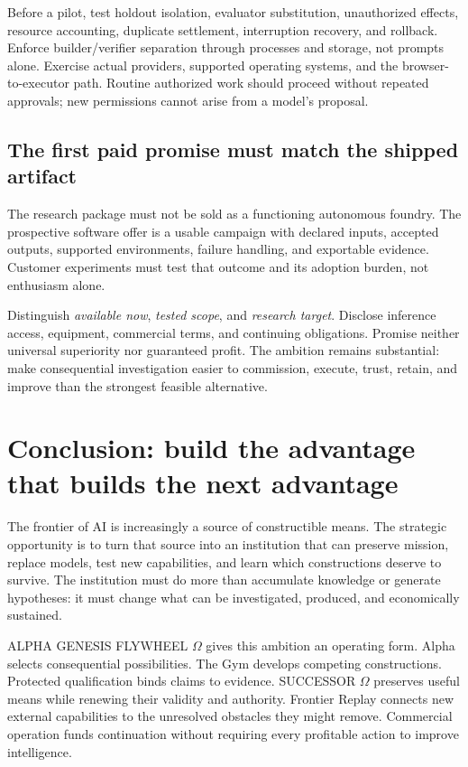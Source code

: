 \documentclass[11pt,letterpaper]{article}
\theoremstyle{remark}\newtheorem{remark}{Remark}[section]
\begin{document}
Before a pilot, test holdout isolation, evaluator substitution, unauthorized effects, resource accounting, duplicate settlement, interruption recovery, and rollback. Enforce builder/verifier separation through processes and storage, not prompts alone. Exercise actual providers, supported operating systems, and the browser-to-executor path. Routine authorized work should proceed without repeated approvals; new permissions cannot arise from a model's proposal.

\subsection{The first paid promise must match the shipped artifact}
The research package must not be sold as a functioning autonomous foundry. The prospective software offer is a usable campaign with declared inputs, accepted outputs, supported environments, failure handling, and exportable evidence. Customer experiments must test that outcome and its adoption burden, not enthusiasm alone.

Distinguish \emph{available now}, \emph{tested scope}, and \emph{research target}. Disclose inference access, equipment, commercial terms, and continuing obligations. Promise neither universal superiority nor guaranteed profit. The ambition remains substantial: make consequential investigation easier to commission, execute, trust, retain, and improve than the strongest feasible alternative.

\section{Conclusion: build the advantage that builds the next advantage}
\label{sec:conclusion}
The frontier of AI is increasingly a source of constructible means. The strategic opportunity is to turn that source into an institution that can preserve mission, replace models, test new capabilities, and learn which constructions deserve to survive. The institution must do more than accumulate knowledge or generate hypotheses: it must change what can be investigated, produced, and economically sustained.

ALPHA GENESIS FLYWHEEL $\Omega$ gives this ambition an operating form. Alpha selects consequential possibilities. The Gym develops competing constructions. Protected qualification binds claims to evidence. SUCCESSOR $\Omega$ preserves useful means while renewing their validity and authority. Frontier Replay connects new external capabilities to the unresolved obstacles they might remove. Commercial operation funds continuation without requiring every profitable action to improve intelligence.
\end{document}
